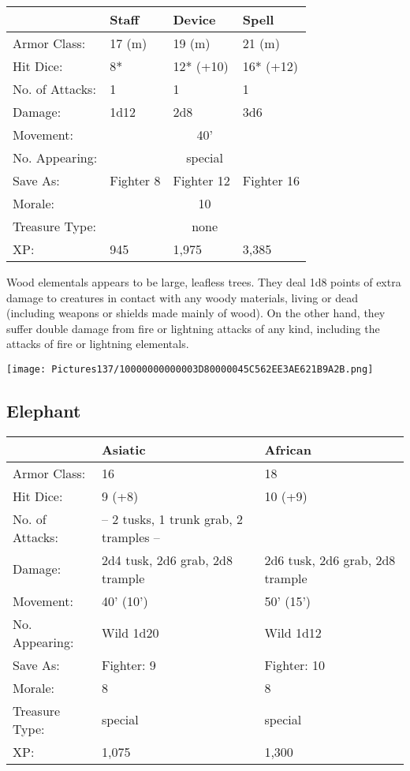 \documentclass[a4paper,twoside,openany,10pt]{book}
\begin{document}
\begin{multicols}{2}
\begin{tabularx}{0.48\textwidth}{@{}lllX@{}}
& Staff & Device & Spell \\\hline
Armor Class: & 17 (m) & 19 (m) & 21 (m) \\\hline
Hit Dice: & 8* & 12* (+10) & 16* (+12) \\\hline
No. of Attacks: & 1 & 1 & 1 \\\hline
Damage: & 1d12 & 2d8 & 3d6 \\\hline
Movement:  & \multicolumn{3}{c}{40'}\\\hline
No. Appearing: &\multicolumn{3}{c}{special} \\\hline
Save As: & Fighter 8 & Fighter 12 & Fighter 16 \\\hline
Morale: & \multicolumn{3}{c}{10} \\\hline
Treasure Type: & \multicolumn{3}{c}{none} \\\hline
XP: & 945 & 1,975 & 3,385 \\\hline
\end{tabularx}\medskip

Wood elementals appears to be large, leafless trees. They deal 1d8 points of extra damage to creatures in contact with any woody materials, living or dead (including weapons or shields made mainly of wood). On the other hand, they suffer double damage from fire or lightning attacks of any kind, including the attacks of fire or lightning elementals.\\

\begin{center}
	\texttt{[image: Pictures137/10000000000003D80000045C562EE3AE621B9A2B.png]}

\end{center}


\subsection*{Elephant}\label{elephant}

\begin{tabularx}{0.48\textwidth}{@{}lXX@{}}
& Asiatic & African \\\hline
Armor Class: & 16 & 18 \\\hline
Hit Dice: & 9 (+8) & 10 (+9) \\\hline
No. of Attacks: & -- 2 tusks, 1 trunk grab, 2 tramples -- & \\\hline
Damage: & 2d4 tusk, 2d6 grab, 2d8 trample & 2d6 tusk, 2d6 grab, 2d8 trample \\\hline
Movement: & 40' (10') & 50' (15') \\\hline
No. Appearing: & Wild 1d20 & Wild 1d12 \\\hline
Save As: & Fighter: 9 & Fighter: 10 \\\hline
Morale: & 8 & 8 \\\hline
Treasure Type: & special & special \\\hline
XP: & 1,075 & 1,300 \\\hline
\end{tabularx}\medskip


\end{multicols}
\end{document}
